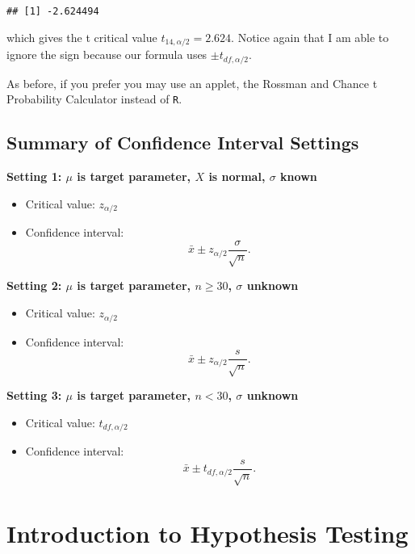 \documentclass[
]{book}
\providecommand{\tightlist}{%
  \setlength{\itemsep}{0pt}\setlength{\parskip}{0pt}}
\begin{document}
\begin{verbatim}
## [1] -2.624494
\end{verbatim}

which gives the t critical value \(t_{14,\alpha/2} = 2.624\). Notice again that I am able to ignore the sign because our formula uses \(\pm t_{df,\alpha/2}\).

As before, if you prefer you may use an applet, the Rossman and Chance t Probability Calculator instead of \texttt{R}.

\hypertarget{summary-of-confidence-interval-settings}{%
\section{Summary of Confidence Interval Settings}\label{summary-of-confidence-interval-settings}}

\textbf{Setting 1: \(\mu\) is target parameter, \(X\) is normal, \(\sigma\) known}

\begin{itemize}
\tightlist
\item
  Critical value: \(z_{\alpha/2}\)
\item
  Confidence interval: \[\bar{x} \pm z_{\alpha/2}\frac{\sigma}{\sqrt{n}}.\]
\end{itemize}

\textbf{Setting 2: \(\mu\) is target parameter, \(n \ge 30\), \(\sigma\) unknown}

\begin{itemize}
\tightlist
\item
  Critical value: \(z_{\alpha/2}\)
\item
  Confidence interval: \[\bar{x} \pm z_{\alpha/2}\frac{s}{\sqrt{n}}.\]
\end{itemize}

\textbf{Setting 3: \(\mu\) is target parameter, \(n < 30\), \(\sigma\) unknown}

\begin{itemize}
\tightlist
\item
  Critical value: \(t_{df, \alpha/2}\)
\item
  Confidence interval: \[\bar{x} \pm t_{df, \alpha/2}\frac{s}{\sqrt{n}}.\]
\end{itemize}

\hypertarget{introduction-to-hypothesis-testing}{%
\chapter{Introduction to Hypothesis Testing}\label{introduction-to-hypothesis-testing}}
\end{document}
